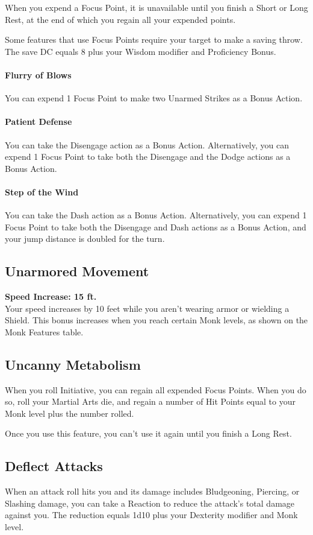 \documentclass[letterpaper,openany,oneside,twocolumn]{book}
\begin{document}
When you expend a Focus Point, it is unavailable until you finish a Short or Long Rest, at the end of which you regain all your expended points.

Some features that use Focus Points require your target to make a saving throw. The save DC equals 8 plus your Wisdom modifier and Proficiency Bonus.

\paragraph*{Flurry of Blows} You can expend 1 Focus Point to make two Unarmed Strikes as a Bonus Action.

\paragraph*{Patient Defense} You can take the Disengage action as a Bonus Action. Alternatively, you can expend 1 Focus Point to take both the Disengage and the Dodge actions as a Bonus Action.

\paragraph*{Step of the Wind} You can take the Dash action as a Bonus Action. Alternatively, you can expend 1 Focus Point to take both the Disengage and Dash actions as a Bonus Action, and your jump distance is doubled for the turn.
\subsection*{Unarmored Movement}
\textbf{Speed Increase: 15 ft.}\\
Your speed increases by 10 feet while you aren't wearing armor or wielding a Shield. This bonus increases when you reach certain Monk levels, as shown on the Monk Features table.
\subsection*{Uncanny Metabolism}
When you roll Initiative, you can regain all expended Focus Points. When you do so, roll your Martial Arts die, and regain a number of Hit Points equal to your Monk level plus the number rolled.

Once you use this feature, you can't use it again until you finish a Long Rest.
\subsection*{Deflect Attacks}
When an attack roll hits you and its damage includes Bludgeoning, Piercing, or Slashing damage, you can take a Reaction to reduce the attack's total damage against you. The reduction equals 1d10 plus your Dexterity modifier and Monk level.
\end{document}
